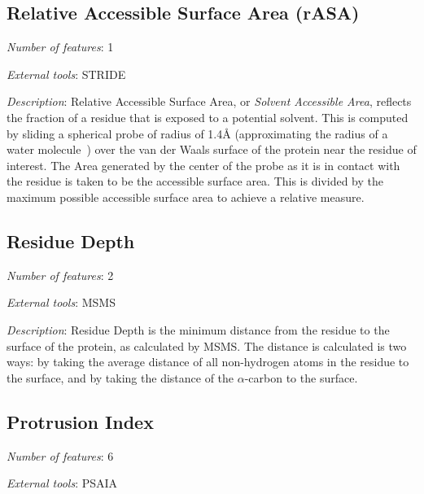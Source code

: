 \subsection{Relative Accessible Surface Area (rASA)}
\noindent
\emph{Number of features}: 1

\noindent
\emph{External tools}: STRIDE~\cite{heinig2004}

\noindent
\emph{Description}:
Relative Accessible Surface Area, or \emph{Solvent Accessible Area}, reflects the fraction of a residue that is exposed to a potential solvent.
This is computed by sliding a spherical probe of radius of 1.4\AA{} (approximating the radius of a water molecule~\cite{eisenhaber1995}) over the van der Waals surface of the protein near the residue of interest.
The Area generated by the center of the probe as it is in contact with the residue is taken to be the accessible surface area.
This is divided by the maximum possible accessible surface area to achieve a relative measure.


\subsection{Residue Depth}
\noindent
\emph{Number of features}: 2

\noindent
\emph{External tools}: MSMS~\cite{sanner1996}

\noindent
\emph{Description}:
Residue Depth is the minimum distance from the residue to the surface of the protein, as calculated by MSMS.
The distance is calculated is two ways: by taking the average distance of all non-hydrogen atoms in the residue to the surface, and by taking the distance of the $\alpha$-carbon to the surface.


\subsection{Protrusion Index}
\noindent
\emph{Number of features}: 6

\noindent
\emph{External tools}: PSAIA~\cite{mihel2008}

